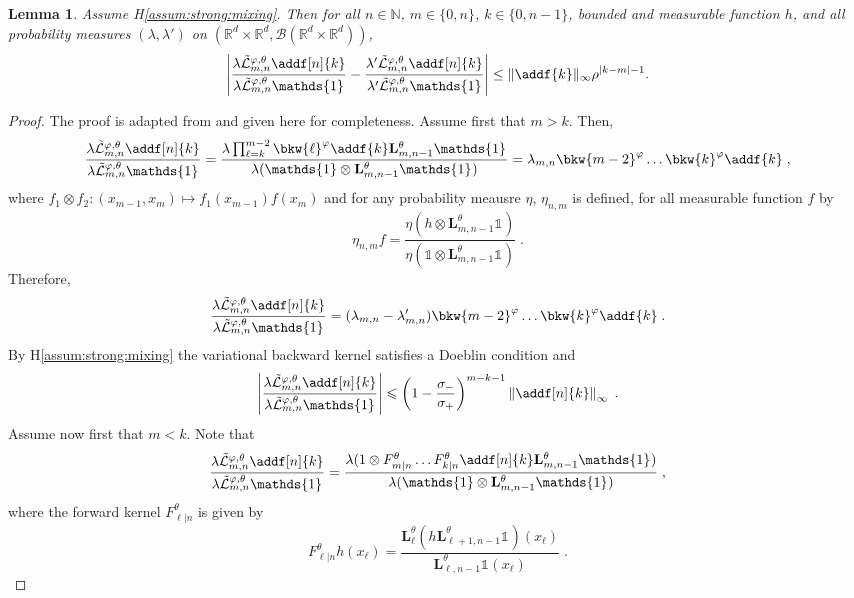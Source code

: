 \documentclass{article}
\newtheorem{lemma}[theorem]{Lemma}
\newcommand{\intvect}[2]{\{ #1, #2 \}}
\newcommand{\nset}{\mathbb{N}}
\newcommand{\1}{\mathbbm{1}}
\newcommand{\uk}[1]{\mathbf{L}_{#1}}
\def\1{\mathds{1}}
\newcommand{\eqsp}{\;}
\begin{document}
\begin{lemma} \label{lem:geo:bound}
Assume H\ref{assum:strong:mixing}. Then for all $n \in \nset$, $m \in \intvect{0}{n}$, $k \in \intvect{0}{n - 1}$, bounded and measurable function $h$, and all probability measures $(\lambda, \lambda')$ on $(\mathbb{R}^d\times\mathbb{R}^d,\mathcal{B}(\mathbb{R}^d\times \mathbb{R}^d))$, 
$$
\left|\frac{\lambda \tilde{\mathcal{L}}^{\varphi,\theta}_{m, n} \addf[n]{k}}{\lambda \tilde{\mathcal{L}}^{\varphi,\theta}_{m, n} \1_{}} - \frac{\lambda' \tilde{\mathcal{L}}^{\varphi,\theta}_{m, n} \addf[n]{k}}{\lambda'  \tilde{\mathcal{L}}^{\varphi,\theta}_{m, n} \1} \right| \leq \| \addf{k} \|_\infty \rho^{|k - m| - 1}. 
$$
\end{lemma}
\begin{proof}
The proof is adapted from  \cite[Lemma~D.3]{gloaguen2019pseudo} and given here for completeness. Assume first that $m>k$. Then,
$$
\frac{\lambda \tilde{\mathcal{L}}^{\varphi,\theta}_{m, n} \addf[n]{k}}{\lambda \tilde{\mathcal{L}}^{\varphi,\theta}_{m, n} \1_{}} = \frac{\lambda \prod_{\ell = k}^{m-2}\bkw{\ell}^\varphi\addf{k}\uk{m, n-1}^\theta\1_{}}{\lambda(\1\otimes \uk{m, n-1}^\theta\1_{})} = \lambda_{m,n}\bkw{m-2}^\varphi \ldots \bkw{k}^\varphi\addf{k}\eqsp,
$$
where $f_1\otimes f_2: (x_{m-1},x_m) \mapsto f_1(x_{m-1})f(x_m)$ and for any probability meausre $\eta$, $\eta_{n,m}$ is defined, for all measurable function $f$ by
$$
\eta_{n,m}f = \frac{\eta (h\otimes \uk{m, n-1}^\theta\1_{})}{\eta (\1\otimes \uk{m, n-1}^\theta\1_{})}\eqsp.
$$
Therefore,
$$
\frac{\lambda \tilde{\mathcal{L}}^{\varphi,\theta}_{m, n} \addf[n]{k}}{\lambda \tilde{\mathcal{L}}^{\varphi,\theta}_{m, n} \1_{}} = (\lambda_{m,n}-\lambda'_{m,n})\bkw{m-2}^\varphi \ldots \bkw{k}^\varphi\addf{k}\eqsp.
$$
By H\ref{assum:strong:mixing} the variational backward kernel satisfies a Doeblin condition and 
$$
\left|\frac{\lambda \tilde{\mathcal{L}}^{\varphi,\theta}_{m, n} \addf[n]{k}}{\lambda \tilde{\mathcal{L}}^{\varphi,\theta}_{m, n} \1_{}}\right|\leqslant  \left(1-\frac{\sigma_-}{\sigma_+}\right)^{m-k-1}\left\|\addf[n]{k}\right\|_\infty\eqsp.
$$
Assume now first that $m< k$. Note that 
$$
\frac{\lambda\tilde{\mathcal{L}}^{\varphi,\theta}_{m, n} \addf[n]{k}}{\lambda\tilde{\mathcal{L}}^{\varphi,\theta}_{m, n} \1_{}}= \frac{\lambda(1\otimes F^\theta_{m|n}\ldots F^\theta_{k|n}\addf[n]{k}\uk{m, n-1}^\theta\1_{})}{\lambda (\1\otimes  \uk{m, n-1}^\theta\1_{})}\eqsp, 
$$
where the forward kernel $ F^\theta_{\ell|n}$ is given by
$$
 F^\theta_{\ell|n}h(x_\ell) = \frac{\uk{\ell}^\theta(h\uk{\ell+1, n-1}^\theta\1_{})(x_\ell)}{ \uk{\ell, n-1}^\theta\1_{}(x_\ell)}\eqsp.
$$
\end{proof}
\end{document}
